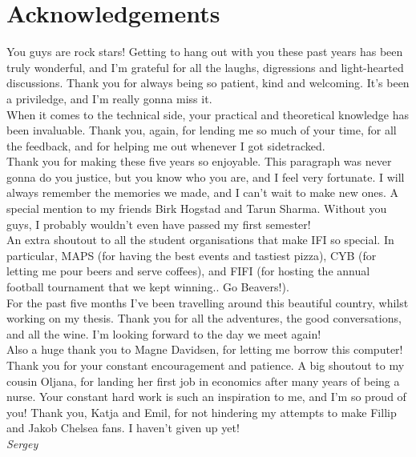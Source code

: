 \chapter*{Acknowledgements}

 You guys are rock stars! Getting to hang out with you these past years has been truly wonderful, and I’m grateful for all the laughs, digressions and light-hearted discussions. Thank you for always being so patient, kind and welcoming. It's been a priviledge, and I’m really gonna miss it. \\

When it comes to the technical side, your practical and theoretical knowledge has been invaluable. Thank you, again, for lending me so much of your time, for all the feedback, and for helping me out whenever I got sidetracked. \\

 Thank you for making these five years so enjoyable. This paragraph was never gonna do you justice, but you know who you are, and I feel very fortunate. I will always remember the memories we made, and I can’t wait to make new ones. A special mention to my friends Birk Hogstad and Tarun Sharma. Without you guys, I probably wouldn't even have passed my first semester! \\

An extra shoutout to all the student organisations that make IFI so special. In particular, MAPS (for having the best events and tastiest pizza), CYB (for letting me pour beers and serve coffees), and FIFI (for hosting the annual football tournament that we kept winning.. Go Beavers!). \\

 For the past five months I’ve been travelling around this beautiful country, whilst working on my thesis. Thank you for all the adventures, the good conversations, and all the wine. I'm looking forward to the day we meet again! \\

Also a huge thank you to Magne Davidsen, for letting me borrow this computer! \\

 Thank you for your constant encouragement and patience. A big shoutout to my cousin Oljana, for landing her first job in economics after many years of being a nurse. Your constant hard work is such an inspiration to me, and I’m so proud of you! Thank you, Katja and Emil, for not hindering my attempts to make Fillip and Jakob Chelsea fans. I haven’t given up yet! \\

\hfill \textit{Sergey}